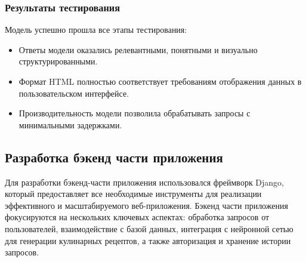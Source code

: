 {{\subsubsection*{Результаты тестирования}
Модель успешно прошла все этапы тестирования:
\begin{itemize}
    \item Ответы модели оказались релевантными, понятными и визуально структурированными.
    \item Формат HTML полностью соответствует требованиям отображения данных в пользовательском интерфейсе.
    \item Производительность модели позволила обрабатывать запросы с минимальными задержками.
\end{itemize}

}
\newpage

\subsection{Разработка бэкенд части приложения}
Для разработки бэкенд-части приложения использовался фреймворк Django, который предоставляет все необходимые инструменты для реализации эффективного и масштабируемого веб-приложения. Бэкенд части приложения фокусируются на нескольких ключевых аспектах: обработка запросов от пользователей, взаимодействие с базой данных, интеграция с нейронной сетью для генерации кулинарных рецептов, а также авторизация и хранение истории запросов.

}
